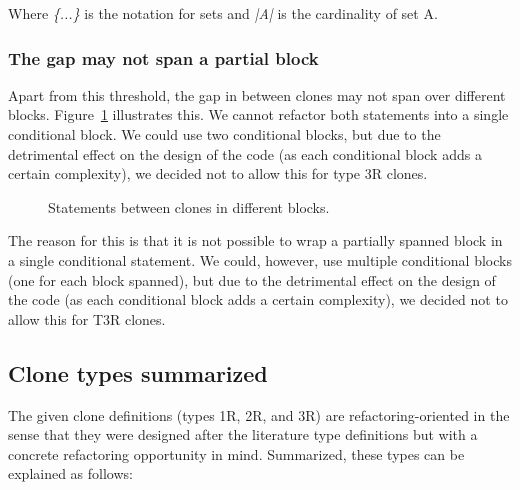 Where \textit{\{...\}} is the notation for sets and \textit{|A|} is the cardinality of set A.

\subsubsection{The gap may not span a partial block} \label{sec:t3rpartialblock}
Apart from this threshold, the gap in between clones may not span over different blocks. Figure~\ref{fig:type3invalid} illustrates this. We cannot refactor both statements into a single conditional block. We could use two conditional blocks, but due to the detrimental effect on the design of the code (as each conditional block adds a certain complexity), we decided not to allow this for type 3R clones.

\begin{figure}[H]
\begin{parcolumns}{2}
\end{parcolumns}
\caption{Statements between clones in different blocks.}
\label{fig:type3invalid}
\end{figure}

The reason for this is that it is not possible to wrap a partially spanned block in a single conditional statement. We could, however, use multiple conditional blocks (one for each block spanned), but due to the detrimental effect on the design of the code (as each conditional block adds a certain complexity), we decided not to allow this for T3R clones.

\subsection{Clone types summarized}
The given clone definitions (types 1R, 2R, and 3R) are refactoring-oriented in the sense that they were designed after the literature type definitions but with a concrete refactoring opportunity in mind. Summarized, these types can be explained as follows:

